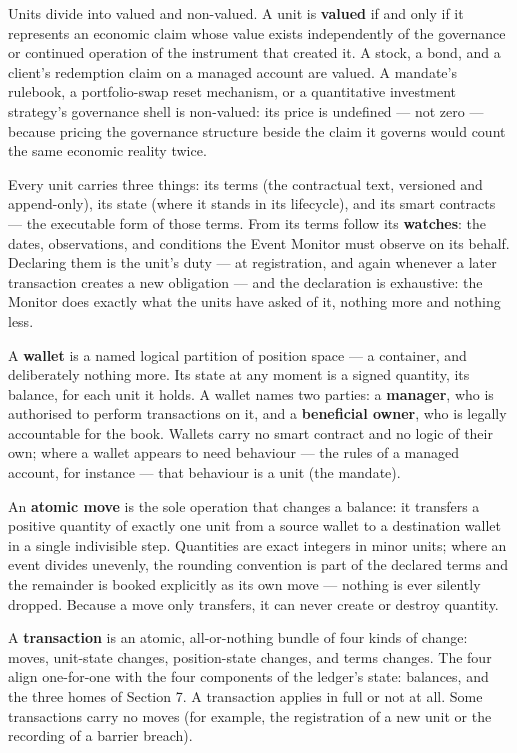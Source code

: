 \documentclass[11pt,a4paper]{article}
\newcommand{\clabel}[1]{\leavevmode\hypertarget{clause-#1}{}%
  \marginpar{\raggedright\scriptsize\ttfamily\textcolor{gray}{#1}}}
\begin{document}
\clabel{C-4.3}Units divide into valued and non-valued. A unit is \textbf{valued} if
and only if it represents an economic claim whose value exists
independently of the governance or continued operation of the instrument
that created it. A stock, a bond, and a client's redemption claim on a
managed account are valued. A mandate's rulebook, a portfolio-swap reset
mechanism, or a quantitative investment strategy's governance shell is
non-valued: its price is undefined --- not zero --- because pricing the
governance structure beside the claim it governs would count the same
economic reality twice.

\clabel{C-4.4}Every unit carries three things: its terms (the contractual text,
versioned and append-only), its state (where it stands in its
lifecycle), and its smart contracts --- the executable form of those
terms. From its terms follow its \textbf{watches}: the dates,
observations, and conditions the Event Monitor must observe on its
behalf. Declaring them is the unit's duty --- at registration, and again
whenever a later transaction creates a new obligation --- and the
declaration is exhaustive: the Monitor does exactly what the units have
asked of it, nothing more and nothing less.

\clabel{C-4.5}A \textbf{wallet} is a named logical partition of position space --- a
container, and deliberately nothing more. Its state at any moment is a
signed quantity, its balance, for each unit it holds. A wallet names two
parties: a \textbf{manager}, who is authorised to perform transactions
on it, and a \textbf{beneficial owner}, who is legally accountable for
the book. Wallets carry no smart contract and no logic of their own;
where a wallet appears to need behaviour --- the rules of a managed
account, for instance --- that behaviour is a unit (the mandate).

\clabel{C-4.6}An \textbf{atomic move} is the sole operation that changes a balance: it
transfers a positive quantity of exactly one unit from a source wallet
to a destination wallet in a single indivisible step. Quantities are
exact integers in minor units; where an event divides unevenly, the
rounding convention is part of the declared terms and the remainder is
booked explicitly as its own move --- nothing is ever silently dropped.
Because a move only transfers, it can never create or destroy quantity.

\clabel{C-4.7}A \textbf{transaction} is an atomic, all-or-nothing bundle of four kinds
of change: moves, unit-state changes, position-state changes, and terms
changes. The four align one-for-one with the four components of the
ledger's state: balances, and the three homes of Section 7. A
transaction applies in full or not at all. Some transactions carry no
moves (for example, the registration of a new unit or the recording of a
barrier breach).
\end{document}
